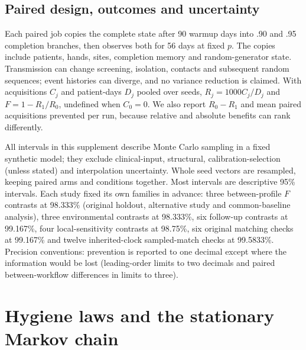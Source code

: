 \documentclass[11pt]{article}
\begin{document}
\subsection{Paired design, outcomes and uncertainty}\label{sec:s-outcomes}
Each paired job copies the complete state after 90 warmup days into .90 and
.95 completion branches, then observes both for 56 days at fixed $p$. The copies
include patients, hands, sites, completion memory and random-generator state.
Transmission can change screening, isolation, contacts and subsequent random
sequences; event histories can diverge, and no variance reduction is claimed.
With acquisitions $C_j$ and patient-days $D_j$ pooled over seeds,
$R_j=1000C_j/D_j$ and $F=1-R_1/R_0$, undefined when $C_0=0$.
We also report $R_0-R_1$ and mean paired acquisitions prevented per run, because
relative and absolute benefits can rank differently.

All intervals in this supplement describe Monte Carlo sampling in a fixed
synthetic model; they exclude clinical-input, structural, calibration-selection
(unless stated) and interpolation uncertainty. Whole seed vectors are resampled,
keeping paired arms and conditions together. Most intervals are descriptive
95\% intervals. Each study fixed its own families in advance: three
between-profile $F$ contrasts at 98.333\% (original holdout, alternative
study and common-baseline analysis), three environmental contrasts at 98.333\%,
six follow-up contrasts at 99.167\%, four local-sensitivity contrasts at
98.75\%, six original matching checks at 99.167\% and twelve inherited-clock
sampled-match checks at 99.5833\%. Precision conventions: prevention is reported
to one decimal except where the information would be lost (leading-order limits
to two decimals and paired between-workflow differences in limits to three).

\section{Hygiene laws and the stationary Markov chain}\label{sec:s-hygiene}
\end{document}

